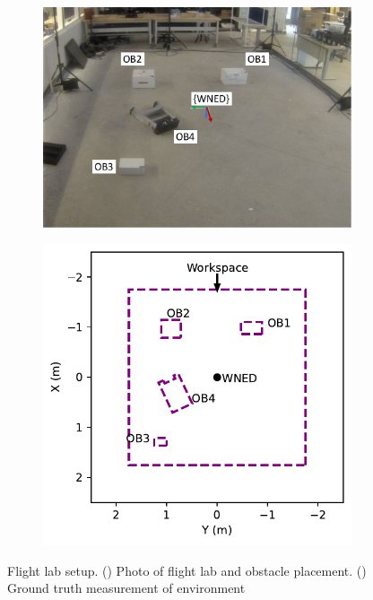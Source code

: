 \begin{figure}[!htb]
  \centering
  \begin{subfigure}[t]{.50\linewidth}
    \centering  \includegraphics[page=2,clip,trim=0cm 1cm 0cm 0cm,width=.99\linewidth]{chapter_7_experiments/imgs/ExperimentSetup.pdf}
    \caption{\label{fig:ch7_workspace_a}}
  \end{subfigure}
  \begin{subfigure}[t]{.35\linewidth}
    \centering\includegraphics[page=1,clip,trim=0cm 0cm 0cm 0cm,width=.99\linewidth]{chapter_7_experiments/imgs/workspace_plot.pdf}
    \caption{\label{fig:ch7_workspace_b}}
  \end{subfigure}
  \caption[Flight lab setup]{Flight lab setup. () Photo of flight lab and obstacle placement. () Ground truth measurement of environment}\label{fig:ch7_workspace}
\end{figure}

